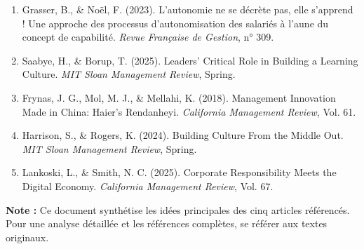 \documentclass[12pt,a4paper]{article}
\begin{document}
\begin{enumerate}
    \item Grasser, B., \& Noël, F. (2023). L'autonomie ne se décrète pas, elle s'apprend ! Une approche des processus d'autonomisation des salariés à l'aune du concept de capabilité. \textit{Revue Française de Gestion}, n° 309.
    
    \item Saabye, H., \& Borup, T. (2025). Leaders' Critical Role in Building a Learning Culture. \textit{MIT Sloan Management Review}, Spring.
    
    \item Frynas, J. G., Mol, M. J., \& Mellahi, K. (2018). Management Innovation Made in China: Haier's Rendanheyi. \textit{California Management Review}, Vol. 61.
    
    \item Harrison, S., \& Rogers, K. (2024). Building Culture From the Middle Out. \textit{MIT Sloan Management Review}, Spring.
    
    \item Lankoski, L., \& Smith, N. C. (2025). Corporate Responsibility Meets the Digital Economy. \textit{California Management Review}, Vol. 67.
\end{enumerate}

\vspace{0.5cm}
\noindent\textbf{Note :} Ce document synthétise les idées principales des cinq articles référencés. Pour une analyse détaillée et les références complètes, se référer aux textes originaux.
\end{document}
